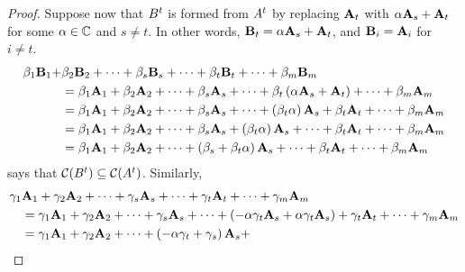 \documentclass{ximera}
\begin{document}
\begin{theorem}
\begin{proof}
    Suppose now that $B^{t}$ is formed from $A^{t}$ by
    replacing $\mathbf{A}_t$ with $\alpha\mathbf{A}_s+\mathbf{A}_t$ for some
    $\alpha\in\mathbb{C}$ and $s\neq t$.  In other words,
    $\mathbf{B}_t=\alpha\mathbf{A}_s+\mathbf{A}_t$, and
    $\mathbf{B}_i=\mathbf{A}_i$ for $i\neq t$.
    \begin{align*}
      \beta_1\mathbf{B}_1+
      &
        \beta_2\mathbf{B}_2+
        \cdots+
        \beta_s\mathbf{B}_s+
        \cdots+
        \beta_t\mathbf{B}_t+
        \cdots+
        \beta_m\mathbf{B}_m\\
      &=
        \beta_1\mathbf{A}_1+
        \beta_2\mathbf{A}_2+
        \cdots+
        \beta_s\mathbf{A}_s+
        \cdots+
        \beta_t\left(\alpha\mathbf{A}_s+\mathbf{A}_t\right)+
        \cdots+
        \beta_m\mathbf{A}_m\\
      &=
        \beta_1\mathbf{A}_1+
        \beta_2\mathbf{A}_2+
        \cdots+
        \beta_s\mathbf{A}_s+
        \cdots+
        \left(\beta_t\alpha\right)\mathbf{A}_s+\beta_t\mathbf{A}_t+
        \cdots+
        \beta_m\mathbf{A}_m\\
      &=
        \beta_1\mathbf{A}_1+
        \beta_2\mathbf{A}_2+
        \cdots+
        \beta_s\mathbf{A}_s+\left(\beta_t\alpha\right)\mathbf{A}_s+
        \cdots+
        \beta_t\mathbf{A}_t+
        \cdots+
        \beta_m\mathbf{A}_m\\
      &=
        \beta_1\mathbf{A}_1+
        \beta_2\mathbf{A}_2+
        \cdots+
        \left(\beta_s+\beta_t\alpha\right)\mathbf{A}_s+
        \cdots+
        \beta_t\mathbf{A}_t+
        \cdots+
        \beta_m\mathbf{A}_m
    \end{align*}
    says that $\mathcal{C}\!\left(B^{t}\right)\subseteq\mathcal{C}\!\left(A^{t}\right)$.  Similarly,
    \begin{align*}
      \gamma_1&\vect{A}_1+
                \gamma_2\vect{A}_2+
                \cdots+
                \gamma_s\vect{A}_s+
                \cdots+
                \gamma_t\vect{A}_t+
                \cdots+
                \gamma_m\vect{A}_m\\
              &=
                \gamma_1\vect{A}_1+
                \gamma_2\vect{A}_2+
                \cdots+
                \gamma_s\vect{A}_s+
                \cdots+
                \left(-\alpha\gamma_t\vect{A}_s + \alpha\gamma_t\vect{A}_s\right)+\gamma_t\vect{A}_t+
                \cdots+
                \gamma_m\vect{A}_m\\
              &=
                \gamma_1\vect{A}_1+
                \gamma_2\vect{A}_2+
                \cdots+
                \left(-\alpha\gamma_t+\gamma_s\right)\vect{A}_s+

\end{align*}
\end{proof}
\end{theorem}
\end{document}
